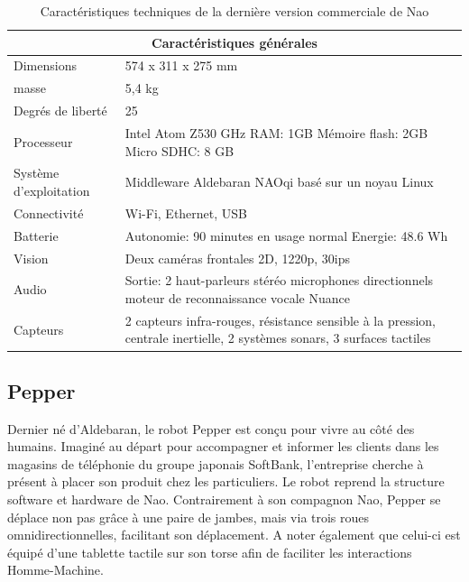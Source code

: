 \begin{table}[h]
	\begin{tabular}{ | l | p{10cm} | }
	\hline
	\multicolumn{2}{|c|}{Caractéristiques générales} \\
	\hline
	Dimensions & 574 x 311 x 275 mm \\
	\hline 
	masse & 5,4 kg \\
	\hline 
	Degrés de liberté  & 25 \\
	\hline
	Processeur & Intel Atom Z530 \newline 1.6 GHz \newline RAM: 1GB \newline Mémoire flash: 2GB  \newline Micro SDHC: 8 GB \\
	\hline
	Système d'exploitation & Middleware Aldebaran NAOqi basé sur un noyau Linux \\
	\hline
	Connectivité & Wi-Fi, Ethernet, USB \\
	\hline
	Batterie & Autonomie: 90 minutes en usage normal \newline Energie: 48.6 Wh \\
	\hline 
	Vision & Deux caméras frontales 2D, 1220p, 30ips \\
	\hline
	Audio & Sortie: 2 haut-parleurs stéréo \newline 4 microphones directionnels \newline moteur de reconnaissance vocale Nuance  \\
	\hline
	Capteurs & 2 capteurs infra-rouges, résistance sensible à la pression, centrale inertielle, 2 systèmes sonars, 3 surfaces tactiles \\
	\hline
	\end{tabular}
\caption[Caractéristiques technique de Nao]{Caractéristiques techniques de la dernière version commerciale  de Nao}
\label {tab: Caractéristiques technique de Nao}
\cite{NaoTech}
\end{table}

\subsection{Pepper}
\label{Entreprise: Les produits: Pepper}
Dernier né d'Aldebaran, le robot Pepper est conçu pour vivre au côté des humains. Imaginé au départ pour accompagner et informer les clients dans les magasins de téléphonie du groupe japonais SoftBank, l'entreprise cherche à présent à placer son produit chez les particuliers. Le robot reprend la structure software et hardware de Nao. Contrairement à son compagnon Nao, Pepper se déplace non pas grâce à une paire de jambes, mais via trois roues omnidirectionnelles, facilitant son déplacement. A noter également que celui-ci est équipé d'une tablette tactile sur son torse afin de faciliter les interactions Homme-Machine.

